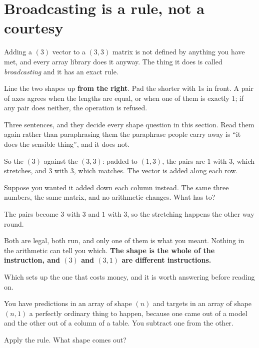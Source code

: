 \section{Broadcasting is a rule, not a courtesy}
\label{sec:P07-broadcast}

\begin{fr}
Adding a $(3)$ vector to a $(3, 3)$ matrix is not defined by anything you have
met, and every array library does it anyway. The thing it does is called
\emph{broadcasting} and it has an exact rule.

\begin{center}
Line the two shapes up \textbf{from the right}. Pad the shorter with $1$s in
front. A pair of axes agrees when the lengths are equal, or when one of them is
exactly $1$; if any pair does neither, the operation is refused.
\end{center}

Three sentences, and they decide every shape question in this section. Read
them again rather than paraphrasing them \dash{} the paraphrase people carry
away is \enquote{it does the sensible thing}, and it does not.
\end{fr}


\begin{fr}
So the $(3)$ against the $(3, 3)$: padded to $(1, 3)$, the pairs are $1$ with
$3$, which stretches, and $3$ with $3$, which matches. The vector is added
along each row.

Suppose you wanted it added down each column instead. The same three numbers,
the same matrix, and no arithmetic changes. What has to?
\dotline
\nextframe
\end{fr}

\begin{fr}
The pairs become $3$ with $3$ and $1$ with $3$, so the stretching happens the
other way round.

Both are legal, both run, and only one of them is what you meant. Nothing in
the arithmetic can tell you which. \textbf{The shape is the whole of the
instruction, and $(3)$ and $(3, 1)$ are different instructions.}

Which sets up the one that costs money, and it is worth answering before
reading on.

You have predictions in an array of shape $(n)$ and targets in an array of
shape $(n, 1)$ \dash{} a perfectly ordinary thing to happen, because one came
out of a model and the other out of a column of a table. You subtract one from
the other.

Apply the rule. What shape comes out?
\dotline
\nextframe
\end{fr}

